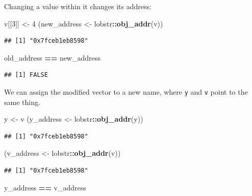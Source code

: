 \documentclass[]{book}
\newenvironment{Shaded}{\begin{snugshade}}{\end{snugshade}}
\newcommand{\DecValTok}[1]{\textcolor[rgb]{0.00,0.00,0.81}{#1}}
\newcommand{\KeywordTok}[1]{\textcolor[rgb]{0.13,0.29,0.53}{\textbf{#1}}}
\newcommand{\NormalTok}[1]{#1}
\newcommand{\OperatorTok}[1]{\textcolor[rgb]{0.81,0.36,0.00}{\textbf{#1}}}
\newcommand{\StringTok}[1]{\textcolor[rgb]{0.31,0.60,0.02}{#1}}
\begin{document}
Changing a value within it changes its address:

\begin{Shaded}
\begin{Highlighting}[]
\NormalTok{v[[}\DecValTok{3}\NormalTok{]] <-}\StringTok{ }\DecValTok{4}
\NormalTok{(new_address <-}\StringTok{ }\NormalTok{lobstr}\OperatorTok{::}\KeywordTok{obj_addr}\NormalTok{(v))}
\end{Highlighting}
\end{Shaded}

\begin{verbatim}
## [1] "0x7fceb1eb8598"
\end{verbatim}

\begin{Shaded}
\begin{Highlighting}[]
\NormalTok{old_address }\OperatorTok{==}\StringTok{ }\NormalTok{new_address}
\end{Highlighting}
\end{Shaded}

\begin{verbatim}
## [1] FALSE
\end{verbatim}

We can assign the modified vector to a new name, where \texttt{y} and \texttt{v} point to the same thing.

\begin{Shaded}
\begin{Highlighting}[]
\NormalTok{y <-}\StringTok{ }\NormalTok{v}
\NormalTok{(y_address <-}\StringTok{ }\NormalTok{lobstr}\OperatorTok{::}\KeywordTok{obj_addr}\NormalTok{(y))}
\end{Highlighting}
\end{Shaded}

\begin{verbatim}
## [1] "0x7fceb1eb8598"
\end{verbatim}

\begin{Shaded}
\begin{Highlighting}[]
\NormalTok{(v_address <-}\StringTok{ }\NormalTok{lobstr}\OperatorTok{::}\KeywordTok{obj_addr}\NormalTok{(v))}
\end{Highlighting}
\end{Shaded}

\begin{verbatim}
## [1] "0x7fceb1eb8598"
\end{verbatim}

\begin{Shaded}
\begin{Highlighting}[]
\NormalTok{y_address }\OperatorTok{==}\StringTok{ }\NormalTok{v_address}
\end{Highlighting}
\end{Shaded}
\end{document}
